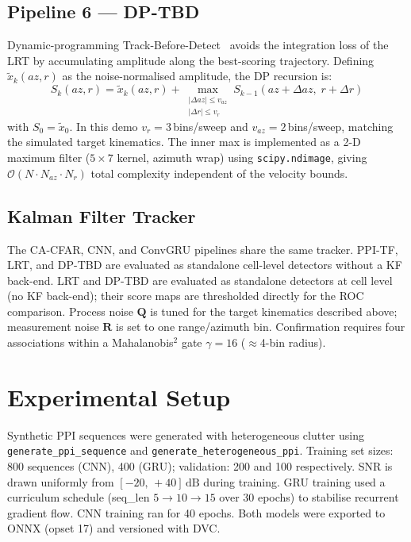 \documentclass[conference]{IEEEtran}
\begin{document}
\subsection{Pipeline 6 --- DP-TBD}

Dynamic-programming Track-Before-Detect~\cite{Barniv1985} avoids
the integration loss of the LRT by accumulating amplitude along the
best-scoring trajectory.
Defining $\tilde{x}_k(az,r)$ as the noise-normalised amplitude, the DP
recursion is:
\begin{equation}
  S_k(az,r) = \tilde{x}_k(az,r) +
  \!\!\max_{\substack{|\Delta az|\le v_{az}\\ |\Delta r|\le v_r}}\!\!
  S_{k-1}(az{+}\Delta az,\;r{+}\Delta r)
  \label{eq:dptbd}
\end{equation}
with $S_0 = \tilde{x}_0$.
In this demo $v_r = 3$\,bins/sweep and $v_{az} = 2$\,bins/sweep, matching
the simulated target kinematics.
The inner max is implemented as a 2-D maximum filter
($5\times7$ kernel, azimuth wrap) using \texttt{scipy.ndimage}, giving
$\mathcal{O}(N\cdot N_{az}\cdot N_r)$ total complexity independent of
the velocity bounds.

\subsection{Kalman Filter Tracker}

The CA-CFAR, CNN, and ConvGRU pipelines share the same tracker.
PPI-TF, LRT, and DP-TBD are evaluated as standalone cell-level
detectors without a KF back-end.
LRT and DP-TBD are evaluated as standalone detectors at cell level
(no KF back-end); their score maps are thresholded directly for the
ROC comparison.
Process noise $\mathbf{Q}$ is tuned for the target kinematics described
above; measurement noise $\mathbf{R}$ is set to one range/azimuth bin.
Confirmation requires four associations within a Mahalanobis$^2$ gate $\gamma = 16$
($\approx$4-bin radius).

\section{Experimental Setup}

Synthetic PPI sequences were generated with heterogeneous clutter using
\texttt{generate\_ppi\_sequence} and \texttt{generate\_heterogeneous\_ppi}.
Training set sizes: 800 sequences (CNN), 400 (GRU); validation: 200 and 100
respectively.
SNR is drawn uniformly from $[-20,\,+40]\,\mathrm{dB}$ during training.
GRU training used a curriculum schedule (seq\_len $5 \to 10 \to 15$ over
30 epochs) to stabilise recurrent gradient flow.
CNN training ran for 40 epochs.
Both models were exported to ONNX (opset 17) and versioned with DVC.
\end{document}
